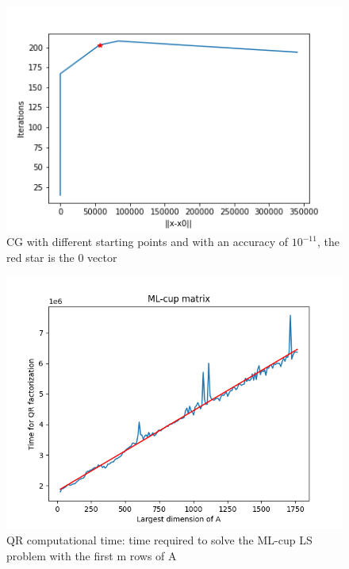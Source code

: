 \documentclass{article}
\begin{document}
	\begin{figure}
            \includegraphics[width=\linewidth]{../results/cg_x0_ite.png}
            \caption{CG with different starting points and with an accuracy of $10^{-11}$, the red star is the 0 vector}
             \label{cg_x0}
       \end{figure}
         \begin{figure}
            \includegraphics[width=\linewidth]{../results/qr_linear_scaling.png}
            \caption{QR computational time: time required to solve the ML-cup LS problem with the first m rows of A}
             \label{qr_cost}
        \end{figure}
\end{document}
